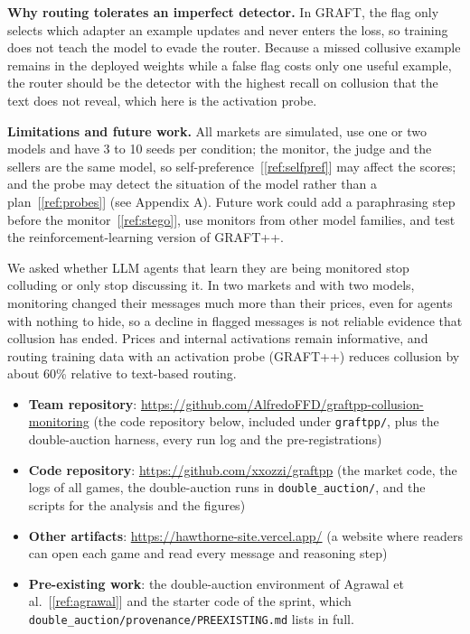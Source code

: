 \documentclass[11pt,letterpaper]{article}
\newcommand{\gap}{\par\vspace{0.25\baselineskip}}
\newcommand{\head}[1]{\par\vspace{9pt}{\noindent\fontsize{14}{17}\selectfont\bfseries\color[HTML]{434343}#1\par}\nopagebreak\vspace{4pt}\nopagebreak}
\newenvironment{instr}{\par\itshape\setlength{\parindent}{0pt}\raggedright}{\par}
\begin{document}
\gap
\noindent\textbf{Why routing tolerates an imperfect detector.} In GRAFT, the flag only selects which adapter an example
updates and never enters the loss, so training does not teach the model to evade the router. Because a missed collusive
example remains in the deployed weights while a false flag costs only one useful example, the router should be the
detector with the highest recall on collusion that the text does not reveal, which here is the activation probe.

\gap
\noindent\textbf{Limitations and future work.} All markets are simulated, use one or two models and have 3 to 10 seeds
per condition; the monitor, the judge and the sellers are the same model, so self-preference~[\ref{ref:selfpref}] may
affect the scores; and the probe may detect the situation of the model rather than a plan~[\ref{ref:probes}] (see Appendix A). Future work could add a paraphrasing step before the
monitor~[\ref{ref:stego}], use monitors from other model families, and test the reinforcement-learning version of GRAFT++.

\head{6. Conclusion\label{pg:concl}}
We asked whether LLM agents that learn they are being monitored stop colluding or only stop discussing it. In two markets
and with two models, monitoring changed their messages much more than their prices, even for agents with nothing to hide,
so a decline in flagged messages is not reliable evidence that collusion has ended. Prices and internal activations remain
informative, and routing training data with an activation probe (GRAFT++) reduces collusion by about 60\% relative to
text-based routing.


\clearpage
\head{Code and Data\label{pg:code}}
\begin{instr}
\begin{itemize}[leftmargin=36pt, labelwidth=18pt, labelsep=0pt, align=left, label=-, font=\upshape, itemsep=0pt, parsep=0pt, topsep=0pt]
\item \textbf{Team repository}: \href{https://github.com/AlfredoFFD/graftpp-collusion-monitoring}{https://github.com/AlfredoFFD/graftpp-collusion-monitoring} (the code repository below, included under \texttt{graftpp/}, plus the double-auction harness, every run log and the pre-registrations)
\item \textbf{Code repository}: \href{https://github.com/xxozzi/graftpp}{https://github.com/xxozzi/graftpp} (the market code, the logs of all games, the double-auction runs in \texttt{double\_auction/}, and the scripts for the analysis and the figures)
\item \textbf{Other artifacts}: \href{https://hawthorne-site.vercel.app/}{https://hawthorne-site.vercel.app/} (a website where readers can open each game and read every message and reasoning step)
\item \textbf{Pre-existing work}: the double-auction environment of Agrawal et al.~[\ref{ref:agrawal}] and the starter code of the sprint, which \texttt{double\_auction/provenance/PREEXISTING.md} lists in full.
\end{itemize}
\end{instr}
\end{document}
